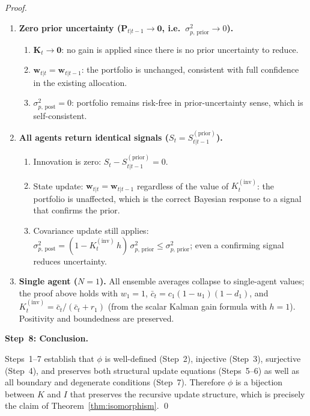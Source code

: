 \documentclass[12pt,openany]{book}
\numberwithin{equation}{chapter}
\theoremstyle{plain}
\theoremstyle{definition}
\theoremstyle{remark}
\def\mathcal#1{#1}%
\begin{document}
\begin{proof}
\begin{enumerate}
\begin{enumerate}
        \end{enumerate}
  \item \textbf{Zero prior uncertainty
        ($\mathbf{P}_{t|t-1} \to \mathbf{0}$,
        i.e.\ $\sigma_{p,\,\text{prior}}^2 \to 0$).}
        \begin{enumerate}
          \item $\mathbf{K}_t \to \mathbf{0}$: no gain is
                applied since there is no prior uncertainty
                to reduce.
          \item $\mathbf{w}_{t|t} = \mathbf{w}_{t|t-1}$:
                the portfolio is unchanged, consistent with
                full confidence in the existing allocation.
          \item $\sigma_{p,\,\text{post}}^2 = 0$: portfolio
                remains risk-free in prior-uncertainty sense,
                which is self-consistent.
        \end{enumerate}
  \item \textbf{All agents return identical signals
        ($S_t = S_{t|t-1}^{(\mathrm{prior})}$).}
        \begin{enumerate}
          \item Innovation is zero:
                $S_t - S_{t|t-1}^{(\mathrm{prior})} = 0$.
          \item State update: $\mathbf{w}_{t|t} =
                \mathbf{w}_{t|t-1}$ regardless of the value
                of $K_t^{(\mathrm{inv})}$: the portfolio is
                unaffected, which is the correct Bayesian
                response to a signal that confirms the prior.
          \item Covariance update still applies:
                $\sigma_{p,\,\text{post}}^2 = (1 -
                K_t^{(\mathrm{inv})}\,h)\,
                \sigma_{p,\,\text{prior}}^2 \leq
                \sigma_{p,\,\text{prior}}^2$; even a
                confirming signal reduces uncertainty.
        \end{enumerate}
  \item \textbf{Single agent ($N=1$).}  All ensemble averages
        collapse to single-agent values; the proof above holds
        with $w_1 = 1$, $\bar{c}_t = c_1(1-u_1)(1-d_1)$, and
        $K_t^{(\mathrm{inv})} = \bar{c}_t / (\bar{c}_t + r_1)$
        (from the scalar Kalman gain formula with $h=1$).
        Positivity and boundedness are preserved.
\end{enumerate}

\medskip
\noindent\textbf{Step~8: Conclusion.}

Steps~1--7 establish that $\phi$ is well-defined (Step~2),
injective (Step~3), surjective (Step~4), and preserves both
structural update equations (Steps~5--6) as well as all
boundary and degenerate conditions (Step~7).  Therefore $\phi$
is a bijection between $\mathcal{K}$ and $\mathcal{I}$ that
preserves the recursive update structure, which is precisely the
claim of Theorem~\ref{thm:isomorphism}.
\qed
\end{proof}
\end{document}
